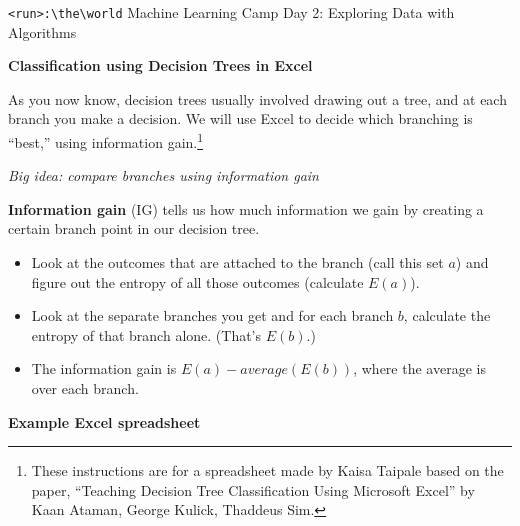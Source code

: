 \documentclass[10pt]{article}
\newcommand{\code}[1]{\colorbox{light-gray}{\texttt{#1}}}
\newcommand{\headerclass}{\code{<run>:\textbackslash the\textbackslash world} Machine Learning Camp}
\newcommand{\headersection}{Day 2: Exploring Data with Algorithms}
\newcommand{\headertitle}{Classification using Decision Trees in Excel}
\begin{document}
\headerclass\xspace {} \headersection\\
\begin{center}{ \large \textbf{\headertitle} }\end{center}


	As you now know, decision trees usually involved drawing out a tree, and at each branch you make a decision. We will use Excel to decide which branching is ``best,'' using information gain.\footnote{These instructions are for a spreadsheet made by Kaisa Taipale based on the paper, ``Teaching Decision Tree Classification Using Microsoft Excel'' by Kaan Ataman, George Kulick, Thaddeus Sim.}
	
	\begin{center}
\textit{Big idea: compare branches using information gain}
\end{center}


\textbf{Information gain} (IG) tells us how much information we gain by creating a certain branch point in our decision tree. 
\begin{itemize}
\item Look at the outcomes that are attached to the branch (call this set $a$) and figure out the entropy of all those outcomes (calculate $E(a)$).
\item Look at the separate branches you get and for each branch $b$, calculate the entropy of that branch alone. (That's $E(b)$.)
\item The information gain is $E(a) - average(E(b))$, where the average is over each branch.
\end{itemize}

\begin{center}
\textbf{Example Excel spreadsheet}
\end{center}
\end{document}

